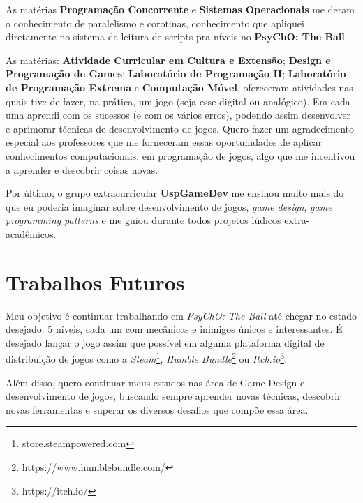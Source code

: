 As matérias \textbf{Programação Concorrente} e \textbf{Sistemas Operacionais} me deram o conhecimento de paralelismo e corotinas, conhecimento que apliquei diretamente no sistema de leitura de scripts pra níveis no \textbf{PsyChO: The Ball}.

As matérias: \textbf{Atividade Curricular em Cultura e Extensão}; \textbf{Design e Programação de Games}; \textbf{Laboratório de Programação II}; \textbf{Laboratório de Programação Extrema} e \textbf{Computação Móvel}, ofereceram atividades nas quais tive de fazer, na prática, um jogo (seja esse digital ou analógico). Em cada uma aprendi com os sucessos (e com os vários erros), podendo assim desenvolver e aprimorar técnicas de desenvolvimento de jogos. Quero fazer um agradecimento especial aos professores que me forneceram essas oportunidades de aplicar conhecimentos computacionais, em programação de jogos, algo que me incentivou a aprender e descobrir coisas novas.

Por último, o grupo extracurricular \textbf{UspGameDev} me ensinou muito mais do que eu poderia imaginar sobre desenvolvimento de jogos, \textit{game design}, \textit{game programming patterns} e me guiou durante todos projetos lúdicos extra-acadêmicos.

\section{Trabalhos Futuros}
\label{sec:trabalhos_futuros}

Meu objetivo é continuar trabalhando em \textit{PsyChO: The Ball} até chegar no estado desejado: 5 níveis, cada um com mecânicas e inimigos únicos e interessantes. É desejado lançar o jogo assim que possível em alguma plataforma dígital de distribuição de jogos como a \textit{Steam}\footnote{store.steampowered.com}, \textit{Humble Bundle}\footnote{https://www.humblebundle.com/} ou \textit{Itch.io}\footnote{https://itch.io/}.

Além disso, quero continuar meus estudos nas área de Game Design e desenvolvimento de jogos, buscando sempre aprender novas técnicas, descobrir novas ferramentas e superar os diversos desafios que compõe essa área.
